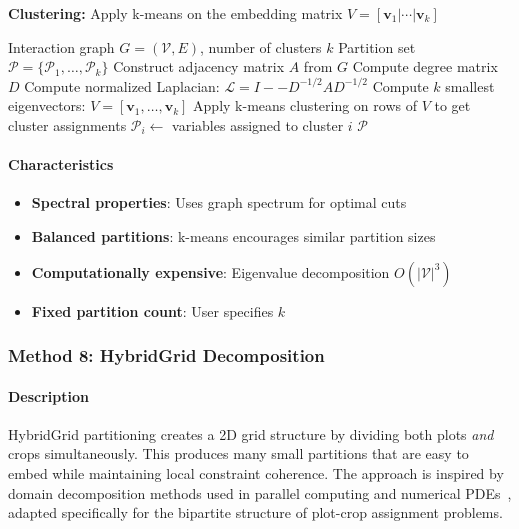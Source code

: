 \documentclass{oqireport}
\begin{document}
\textbf{Clustering:} Apply k-means on the embedding matrix $V = [\mathbf{v}_1 | \cdots | \mathbf{v}_k]$

\begin{algorithm}
\caption{Spectral Clustering Decomposition}
\begin{algorithmic}[1]
\Require Interaction graph $G = (\mathcal{V}, E)$, number of clusters $k$
\Ensure Partition set $\mathcal{P} = \{\mathcal{P}_1, \ldots, \mathcal{P}_k\}$
\State Construct adjacency matrix $A$ from $G$
\State Compute degree matrix $D$
\State Compute normalized Laplacian: $\mathcal{L} = I -- D^{-1/2} A D^{-1/2}$
\State Compute $k$ smallest eigenvectors: $V = [\mathbf{v}_1, \ldots, \mathbf{v}_k]$
\State Apply k-means clustering on rows of $V$ to get cluster assignments
    \State $\mathcal{P}_i \leftarrow$ variables assigned to cluster $i$
\EndFor
\State \Return $\mathcal{P}$
\end{algorithmic}
\end{algorithm}

\paragraph{Characteristics}
\begin{itemize}
\item \textbf{Spectral properties}: Uses graph spectrum for optimal cuts
\item \textbf{Balanced partitions}: k-means encourages similar partition sizes
\item \textbf{Computationally expensive}: Eigenvalue decomposition $O(|\mathcal{V}|^3)$
\item \textbf{Fixed partition count}: User specifies $k$
\end{itemize}

\subsubsection{Method 8: HybridGrid Decomposition}

\paragraph{Description}
HybridGrid partitioning creates a 2D grid structure by dividing both plots \emph{and} crops simultaneously. This produces many small partitions that are easy to embed while maintaining local constraint coherence. The approach is inspired by domain decomposition methods used in parallel computing and numerical PDEs~\cite{toselli2005domain, smith1996domain}, adapted specifically for the bipartite structure of plot-crop assignment problems.
\end{document}

